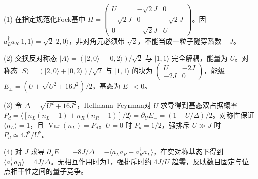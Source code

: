 (1) 在指定规范化Fock基中 \(H=\begin{pmatrix}U&-\sqrt2J&0\\-\sqrt2J&0&-\sqrt2J\\0&-\sqrt2J&U\end{pmatrix}\)。因 \(a_L^\dagger a_R|1,1\rangle=\sqrt2|2,0\rangle\)，非对角元必须带 \(\sqrt2\)，不能当成一粒子隧穿系数 \(-J\)。

(2) 交换反对称态 \(|A\rangle=(|2,0\rangle-|0,2\rangle)/\sqrt2\) 与 \(|1,1\rangle\) 完全解耦，能量为 \(U\)。对称态 \(|S\rangle=(|2,0\rangle+|0,2\rangle)/\sqrt2\) 与 \(|1,1\rangle\) 的块为 \(\begin{pmatrix}U&-2J\\-2J&0\end{pmatrix}\)，能级 \(\boxed{E_\pm=(U\pm\sqrt{U^2+16J^2})/2}\)，基态为 \(E_-<0\)。

(3) 令 \(\Delta=\sqrt{U^2+16J^2}\)，Hellmann–Feynman对 \(U\) 求导得到基态双占据概率 \(P_d=\langle[n_L(n_L-1)+n_R(n_R-1)]/2\rangle=\partial_UE_-=(1-U/\Delta)/2\)。对称性保证 \(\langle n_L\rangle=1\)，且 \(\operatorname{Var}(n_L)=P_d\)。\(U=0\) 时 \(P_d=1/2\)，强排斥 \(U\gg J\) 时 \(P_d\simeq4J^2/U^2\)。

(4) 对 \(J\) 求导 \(\partial_JE_-=-8J/\Delta=-\langle a_L^\dagger a_R+a_R^\dagger a_L\rangle\)，在实对称基态下得到 \(\boxed{\langle a_L^\dagger a_R\rangle=4J/\Delta}\)。无相互作用时为1，强排斥时约 \(4J/U\) 趋零，反映数目固定与位点相干性之间的量子竞争。
